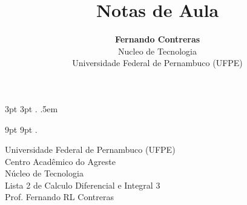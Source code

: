 \theoremstyle{note}
\newtheorem{note}{Note}

  {3pt}%
  {3pt}%
  {\itshape}%
  {}%
  {\bfseries}%
  {.}%
  {.5em}%
  {}%

\theoremstyle{citing}
\newtheorem*{varthm}{}%

  {9pt}%
  {9pt}%
  {\itshape}%
  {}%
  {\bfseries}%
  {.}%
  {\newline}%
  {}%

\theoremstyle{break}
\newtheorem{bthm}{B-Theorem}

\theoremstyle{exercise}
\newtheorem{exer}{Exercise}

\swapnumbers
\theoremstyle{plain}
\newtheorem{thmsw}{Theorem}[section]
\newtheorem{propsw}{Proposition}

\let\lvert=|\let\rvert=|
\newcommand{\Ric}{\mathop{\mathrm{Ric}}\nolimits}

\addtolength{\textwidth}{8pt}

\title{ \textbf{Notas de Aula}}

\author{\textbf{Fernando Contreras}\\
	\large Nucleo de Tecnologia\\
	Universidade Federal de Pernambuco (UFPE)}




	\begin{center}
		Universidade Federal de Pernambuco (UFPE)\\
		Centro Acadêmico do Agreste\\
		Núcleo de Tecnologia\\
		
		Lista 2 de Calculo Diferencial e Integral 3\\
		Prof. Fernando RL Contreras
	\end{center}



